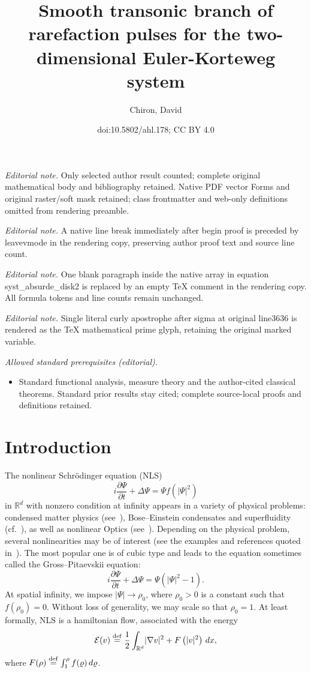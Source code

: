\documentclass[10pt]{amsart}
\title{Smooth transonic branch of rarefaction pulses for the two-dimensional Euler-Korteweg system}
\author{Chiron, David}
\date{doi:10.5802/ahl.178; CC BY 4.0}
\theoremstyle{definition}\newtheorem{defi}[theo]{Definition}\newtheorem{rema}[theo]{Remark}\newtheorem{exam}[theo]{Example}\newtheorem{exem}[theo]{Example}\newtheorem{nota}[theo]{Notation}
\newcommand*\p{\partial}
\newcommand*\R{\mathbb R}
\newcommand*\ddef{\stackrel{\rm def}{=}}
\newcommand*\BE{\mathcal{E}}
\begin{document}
\maketitle
\noindent\textit{Editorial note.} Only selected author result counted; complete original mathematical body and bibliography retained. Native PDF vector Forms and original raster/soft mask retained; class frontmatter and web-only definitions omitted from rendering preamble.\par\medskip
\noindent\textit{Editorial note.} A native line break immediately after begin proof is preceded by leavevmode in the rendering copy, preserving author proof text and source line count.\par\medskip
\noindent\textit{Editorial note.} One blank paragraph inside the native array in equation syst\_absurde\_disk2 is replaced by an empty TeX comment in the rendering copy. All formula tokens and line counts remain unchanged.\par\medskip
\noindent\textit{Editorial note.} Single literal curly apostrophe after sigma at original line3636 is rendered as the TeX mathematical prime glyph, retaining the original marked variable.\par\medskip
\noindent\textit{Allowed standard prerequisites (editorial).}\begin{itemize}
\item Standard functional analysis, measure theory and the author-cited classical theorems. Standard prior results stay cited; complete source-local proofs and definitions retained.
\end{itemize}\medskip

\section{Introduction}

The nonlinear Schr\"odinger equation (NLS)
\begin{equation}
\tag{NLS} i \frac{\p \Psi}{\p t} + \Delta \Psi = \Psi f\left(|\Psi|^2\right)
\end{equation}
in $\R^d $ with nonzero condition at infinity appears in a variety of physical problems: condensed matter physics (see~\cite{Pismen}), Bose--Einstein condensates and superfluidity (cf.~\cite{AHMNPTB:03,RB}), as well as nonlinear Optics (see~\cite{KL}). Depending on the physical problem, several nonlinearities may be of interest (see the examples and references quoted in~\cite{C1d, ChiSch15}). The most popular one is of cubic type and leads to the equation sometimes called the Gross--Pitaevskii equation:
\begin{equation*}
i \frac{\p \Psi}{\p t} + \Delta \Psi = \Psi \left(|\Psi|^2 - 1\right).
\end{equation*}
At spatial infinity, we impose $ | \Psi | \to \rho_0 $, where $ \rho_0 > 0 $ is a constant such that $ f (\rho_0) = 0 $. Without loss of generality, we may scale so that $ \rho_0 =1 $. At least formally, NLS is a hamiltonian flow, associated with the energy
\[
\BE (v) \ddef \frac{1}{2} \int_{\R^d} \lvert \nabla v \rvert^2 + F\left(| v |^2\right) \, dx,
\]
where $ F(\rho) \ddef \int_1^\rho f(\varrho) \, d \varrho $.
\end{document}
